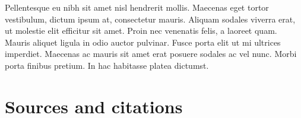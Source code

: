 \documentclass[a4paper, 11pt] {article}
\begin{document}
Pellentesque eu nibh sit amet nisl hendrerit mollis. Maecenas eget tortor vestibulum, dictum ipsum at, consectetur mauris. Aliquam sodales viverra erat, ut molestie elit efficitur sit amet. Proin nec venenatis felis, a laoreet quam. Mauris aliquet ligula in odio auctor pulvinar. Fusce porta elit ut mi ultrices imperdiet. Maecenas ac mauris sit amet erat posuere sodales ac vel nunc. Morbi porta finibus pretium. In hac habitasse platea dictumst. 

\section*{Sources and citations}
\end{document}
